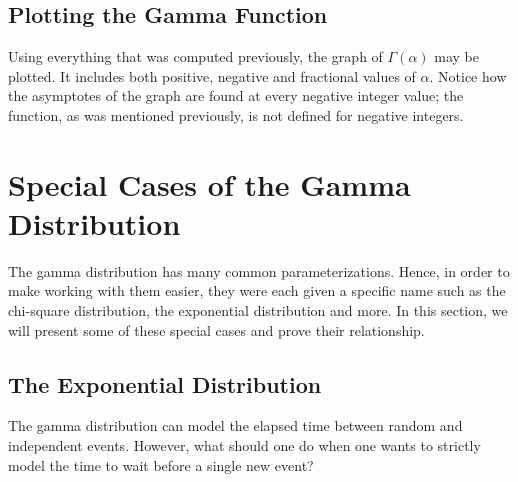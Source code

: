 \documentclass[12pt]{article}
\begin{document}

\pagebreak
\subsection{Plotting the Gamma Function}
Using everything that was computed previously, the graph of $\Gamma(\alpha)$ may be plotted. It includes both positive,
negative and fractional values of $\alpha$. Notice how the asymptotes of the graph are found at every negative integer
value; the function, as was mentioned previously, is not defined for negative integers.


\pagebreak
\section{Special Cases of the Gamma Distribution}
The gamma distribution has many common parameterizations. Hence, in order to make working with them easier, they were
each given a specific name such as the chi-square distribution, the exponential distribution and more. In this section,
we will present some of these special cases and prove their relationship.

\subsection{The Exponential Distribution}\label{subsec:specialcases:exponential}
The gamma distribution can model the elapsed time between random and independent events. However, what should one do
when one wants to strictly model the time to wait before a single new event?
\end{document}
